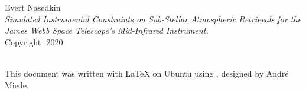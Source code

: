 
\thispagestyle{empty}

\hfill


\begin{center}
Evert Nasedkin \\
\smallskip
\textit{Simulated Instrumental Constraints on Sub-Stellar Atmospheric Retrievals for the James Webb Space Telescope's Mid-Infrared Instrument.}\\
\smallskip
Copyright\,\textcopyright\ 2020
\end{center}

\medskip

\noindent\textsf{} \\
\noindent
This document was written with \LaTeX{} on Ubuntu using \arsclassica, designed by Andr\'e Miede.

\bigskip

\noindent
\textsf{}

\noindent
{}\,